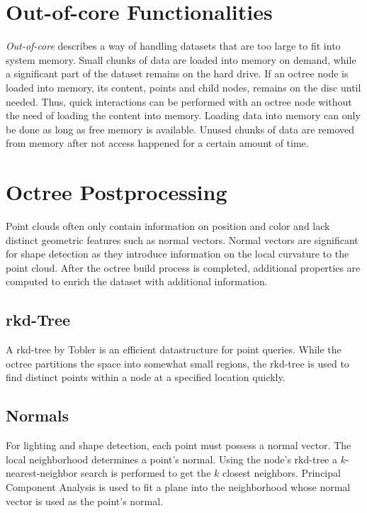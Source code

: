 \section{Out-of-core Functionalities}

\textit{Out-of-core} describes a way of handling datasets that are too large to fit into system memory. Small chunks of data are loaded into memory on demand, while a significant part of the dataset remains on the hard drive. If an octree node is loaded into memory, its content, points and child nodes, remains on the disc until needed. Thus, quick interactions can be performed with an octree node without the need of loading the content into memory. 
Loading data into memory can only be done as long as free memory is available. Unused chunks of data are removed from memory after not access happened for a certain amount of time. 


\section{Octree Postprocessing}

Point clouds often only contain information on position and color and lack distinct geometric features such as normal vectors. Normal vectors are significant for shape detection as they introduce information on the local curvature to the point cloud.  After the octree build process is completed, additional properties are computed to enrich the dataset with additional information. 


\subsection{rkd-Tree}

A rkd-tree by Tobler \cite{tobler2011rkd} is an efficient datastructure for point queries. While the octree partitions the space into somewhat small regions, the rkd-tree is used to find distinct points within a node at a specified location quickly. 


\subsection{Normals}

For lighting and shape detection, each point must possess a normal vector. The local neighborhood determines a point's normal. Using the node's rkd-tree a $k$-nearest-neighbor search is performed to get the $k$ closest neighbors. Principal Component Analysis \cite{jolliffe2002principal} is used to fit a plane into the neighborhood whose normal vector is used as the point's normal.


